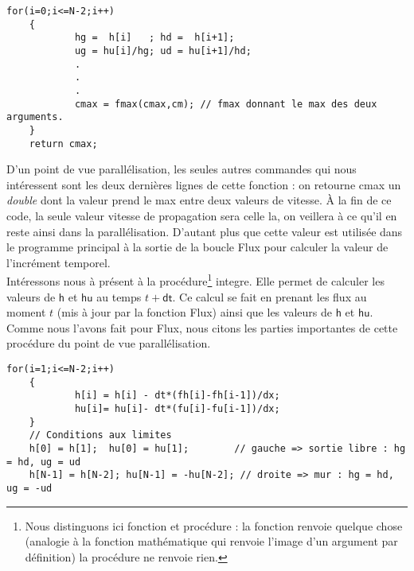 \documentclass[french]{article}
\newcommand{\hhu}{$\mathsf{h}$ et $\mathsf{hu}$}
\begin{document}
\begin{minipage}{455 pt}
\centering

\begin{lstlisting}[label=code1, caption = Quelques lignes de la fonction Flux]
	for(i=0;i<=N-2;i++)
  	{
    		hg =  h[i]   ; hd =  h[i+1]; 
    		ug = hu[i]/hg; ud = hu[i+1]/hd;
    		.
    		.
    		.
    		cmax = fmax(cmax,cm); // fmax donnant le max des deux arguments.
  	}
	return cmax;

\end{lstlisting}
\end{minipage}

\noindent D'un point de vue parallélisation, les seules autres commandes qui nous intéressent sont les deux dernières lignes de cette fonction : on retourne cmax un \textit{double} dont la valeur prend le max entre deux valeurs de vitesse. À la fin de ce code, la seule valeur vitesse de propagation sera celle la, on veillera à ce qu'il en reste ainsi dans la parallélisation. D'autant plus que cette valeur est utilisée dans le programme principal à la sortie de la boucle Flux pour calculer la valeur de l'incrément temporel.\\

Intéressons nous à présent à la procédure\footnote{Nous distinguons ici fonction et procédure : la fonction renvoie quelque chose (analogie à la fonction mathématique qui renvoie l'image d'un argument par définition) la procédure ne renvoie rien.} integre. Elle permet de calculer les valeurs de \hhu $ $ au temps $t+\mathsf{dt}$. Ce calcul se fait en prenant les flux au moment $t$ (mis à jour par la fonction Flux) ainsi que les valeurs de \hhu . Comme nous l'avons fait pour Flux, nous citons les parties importantes de cette procédure du point de vue parallélisation.

\begin{minipage}{455 pt}
\centering

\begin{lstlisting}[label=code2, caption = Quelques lignes de la procédure integre]
  	for(i=1;i<=N-2;i++)
  	{	
    		h[i] = h[i] - dt*(fh[i]-fh[i-1])/dx;
    		hu[i]= hu[i]- dt*(fu[i]-fu[i-1])/dx;
  	}
  	// Conditions aux limites 
  	h[0] = h[1];  hu[0] = hu[1]; 		// gauche => sortie libre : hg = hd, ug = ud
  	h[N-1] = h[N-2]; hu[N-1] = -hu[N-2]; // droite => mur : hg = hd, ug = -ud

\end{lstlisting}
\end{minipage}
\end{document}
